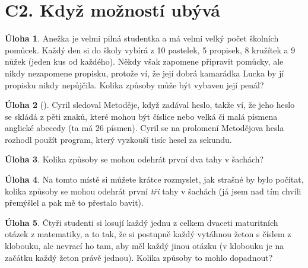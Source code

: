 \documentclass[8pt,a5paper]{extarticle}
\def\tisk{%
\newbox\shipouthackbox
\pdfpagewidth=2\pdfpagewidth
\let\oldshipout=\shipout
\def\shipout{\afterassignment\zdvojtmp \setbox\shipouthackbox=}%
\def\zdvojtmp{\aftergroup\zdvoj}%
\def\zdvoj{%
    \oldshipout\vbox{\hbox{%
        \copy\shipouthackbox
        \hskip\dimexpr .5\pdfpagewidth-\wd\shipouthackbox\relax
        \box\shipouthackbox
    }}%
}}%
\theoremstyle{definition}
\newtheorem{uloha}{\atr Úloha}
\let\ee\expandafter
\let\vysl\vyslplain
\def\locvysl#1{\ee\gdef\ee\locvysld\ee{\locvysld\item #1}}
\let\lv\locvysl
\newenvironment{ulohav}[1][]{\begin{uloha}[#1]\gdef\locvysld{\begin{enumerate*}}}{\ee\vyslplain\ee{\locvysld\end{enumerate*}}\end{uloha}}
\def\atr{}
\def\interest{\def\atr{\llap{$\star$ }\gdef\atr{}}}
\let\results\newpage
\let\endresults\relax
\def\resultssame{%
    \long\def\results##1\endresults{%
        \vfill\noindent\rotatebox{180}{\vbox{##1}}%
    }%
}
\begin{document}

\section*{C2. Když možností ubývá}


\begin{uloha}
Anežka je velmi pilná studentka a má velmi velký počet školních pomůcek. Každý den si do školy vybírá z 10 pastelek, 5 propisek, 8 kružítek a 9 nůžek (jeden kus od každého). Někdy však zapomene připravit pomůcky, ale nikdy nezapomene propisku, protože ví, že její dobrá kamarádka Lucka by jí propisku nikdy nepůjčila. Kolika způsoby může být vybaven její penál?\vysl{$4950 = 11 \cdot 5 \cdot 9 \cdot 10$}
\end{uloha}


\begin{ulohav}\label{cm}
Cyril sledoval Metoděje, když zadával heslo, takže ví, že jeho heslo se skládá z pěti znaků, které mohou být číslice nebo velká či malá písmena anglické abecedy (ta má 26 písmen). Cyril se na prolomení Metodějova hesla rozhodl použít program, který vyzkouší tisíc hesel za sekundu.
\end{ulohav}


\begin{uloha}
Kolika způsoby se mohou odehrát první dva tahy v šachách?\vysl{$400 = 20 \cdot 20$}
\end{uloha}

\interest
\begin{uloha}
Na tomto místě si můžete krátce rozmyslet, jak strašné by bylo počítat, kolika způsoby se mohou odehrát první \emph{tři} tahy v šachách (já jsem nad tím chvíli přemýšlel a pak mě to přestalo bavit).
\end{uloha}


\begin{uloha}
Čtyři studenti si losují každý jednu z celkem dvaceti maturitních otázek z matematiky, a to tak, že si postupně každý vytáhnou žeton s číslem z klobouku, ale nevrací ho tam, aby měl každý jinou otázku (v klobouku je na začátku každý žeton právě jednou). Kolika způsoby to mohlo dopadnout?\vysl{$116\,280 = 20 \cdot 19 \cdot 18 \cdot 17$}
\end{uloha}
\end{document}
